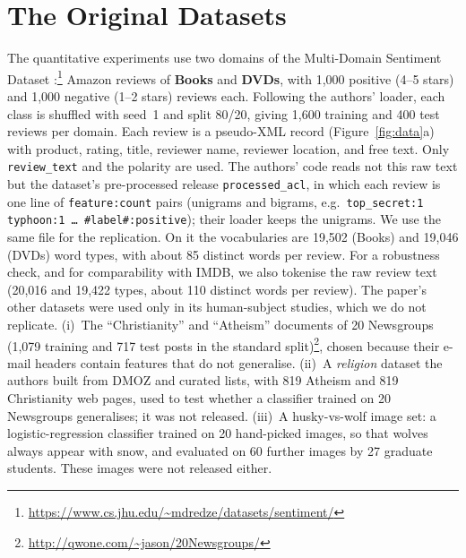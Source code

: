 \documentclass[11pt]{article}
\begin{document}
\section{The Original Datasets}
\label{sec:data}
The quantitative experiments use two domains of the Multi-Domain Sentiment Dataset \citep{blitzer2007}:\footnote{\url{https://www.cs.jhu.edu/~mdredze/datasets/sentiment/}} Amazon reviews of \textbf{Books} and \textbf{DVDs}, with 1,000 positive (4--5 stars) and 1,000 negative (1--2 stars) reviews each. Following the authors' loader, each class is shuffled with seed~1 and split 80/20, giving 1,600 training and 400 test reviews per domain. Each review is a pseudo-XML record (Figure~\ref{fig:data}a) with product, rating, title, reviewer name, reviewer location, and free text. Only \texttt{review\_text} and the polarity are used. The authors' code reads not this raw text but the dataset's pre-processed release \texttt{processed\_acl}, in which each review is one line of \texttt{feature:count} pairs (unigrams and bigrams, e.g.\ \texttt{top\_secret:1 typhoon:1 \ldots{} \#label\#:positive}); their loader keeps the unigrams. We use the same file for the replication. On it the vocabularies are 19,502 (Books) and 19,046 (DVDs) word types, with about 85 distinct words per review. For a robustness check, and for comparability with IMDB, we also tokenise the raw review text (20,016 and 19,422 types, about 110 distinct words per review). The paper's other datasets were used only in its human-subject studies, which we do not replicate. (i)~The ``Christianity'' and ``Atheism'' documents of 20 Newsgroups \citep{lang1995} (1,079 training and 717 test posts in the standard split)\footnote{\url{http://qwone.com/~jason/20Newsgroups/}}, chosen because their e-mail headers contain features that do not generalise. (ii)~A \emph{religion} dataset the authors built from DMOZ and curated lists, with 819 Atheism and 819 Christianity web pages, used to test whether a classifier trained on 20 Newsgroups generalises; it was not released. (iii)~A husky-vs-wolf image set: a logistic-regression classifier trained on 20 hand-picked images, so that wolves always appear with snow, and evaluated on 60 further images by 27 graduate students. These images were not released either.
\end{document}

